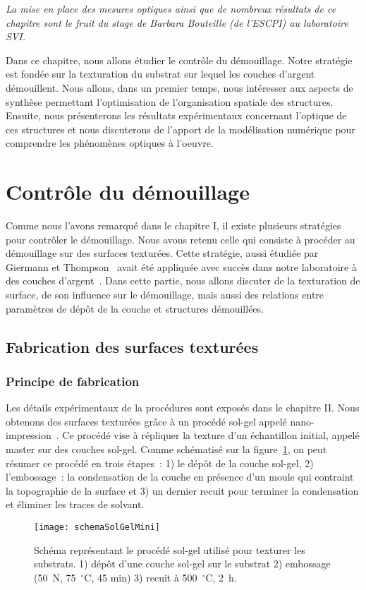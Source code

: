 \minitoc
\newpage

\textit{La mise en place des mesures optiques ainsi que de nombreux résultats de ce chapitre sont le fruit du stage de Barbara Bouteille (de l'ESCPI) au laboratoire SVI.}\par 
Dans ce chapitre, nous allons étudier le contrôle du démouillage. Notre stratégie est fondée sur la texturation du substrat sur lequel les couches d’argent démouillent. Nous allons, dans un premier temps, nous intéresser aux aspects de synthèse permettant l'optimisation de l'organisation spatiale des structures. Ensuite, nous présenterons les résultats expérimentaux concernant l’optique de ces structures et nous discuterons de l’apport de la modélisation numérique pour comprendre les phénomènes optiques à l’oeuvre.

\section{Contrôle du démouillage}
Comme nous l’avons remarqué dans le chapitre I, il existe plusieurs stratégies pour contrôler le démouillage. Nous avons retenu celle qui consiste à procéder au démouillage sur des surfaces texturées. Cette stratégie, aussi étudiée par Giermann et Thompson~\cite{giermann2005solid, giermann2011requirements} avait été appliquée avec succès dans notre laboratoire à des couches d’argent~\cite{le2014self}. Dans cette partie, nous allons discuter de la texturation de surface, de son influence sur le démouillage, mais aussi des relations entre paramètres de dépôt de la couche et structures démouillées.\par 

	\subsection{Fabrication des surfaces texturées}
	\subsubsection{Principe de fabrication}
Les détails expérimentaux de la procédures sont exposés dans le chapitre II. Nous obtenons des surfaces texturées grâce à un procédé sol-gel appelé nano-impression~\cite{le2014self,chou1996nanoimprint}. Ce procédé vise à répliquer la texture d’un échantillon initial, appelé \og master \fg{} sur des couches sol-gel. Comme schématisé sur la figure~\ref{schemaSolGelMini}, on peut résumer ce procédé en trois étapes~: 1) le dépôt de la couche sol-gel, 2) l’embossage~: la condensation de la couche en présence d’un moule qui contraint la topographie de la surface et 3) un dernier recuit pour terminer la condensation et éliminer les traces de solvant.
\begin{figure}[!htb]
\centering
\texttt{[image: schemaSolGelMini]}
\caption{Schéma représentant le procédé sol-gel utilisé pour texturer les substrats. 1) dépôt d’une couche sol-gel sur le substrat 2) embossage (50~N, 75~$^\circ$C, 45 min) 3) recuit à 500~$^\circ$C, 2~h.}
\label{schemaSolGelMini}
\end{figure}

